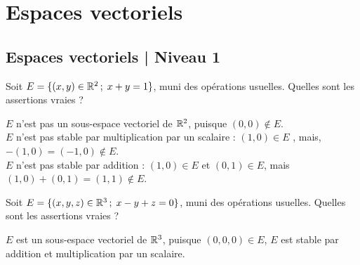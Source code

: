 

\section{Espaces vectoriels}
\subsection{Espaces vectoriels | Niveau 1}

\begin{question}
Soit $E=\{(x,y)\in \mathbb{R}^2 \, ; \;  x+y=1\}$, muni des opérations usuelles. Quelles sont les assertions vraies ?
\begin{answers}  
\end{answers}
\begin{explanations}
$E$ n'est pas un sous-espace vectoriel de $\mathbb{R}^2$, puisque $(0,0) \notin E$.\\
$E$ n'est pas stable par multiplication par un scalaire : $(1,0) \in E$ , mais,  $-(1,0)=(-1,0) \notin E$.\\
$E$ n'est pas stable par addition : $(1,0)  \in E $ et $(0,1)  \in E $, mais $(1,0)+(0,1)=(1,1) \notin E$.
\end{explanations}
\end{question}



\begin{question}
Soit $E=\{(x,y,z) \in \mathbb{R}^3 \,  ; \; x-y+z=0\}$, muni des opérations usuelles. Quelles sont les assertions vraies ?
\begin{answers}  
\end{answers}
\begin{explanations}
$E$ est un sous-espace vectoriel de $\mathbb{R}^3$, puisque $(0,0,0) \in E$, $E$ est stable par addition 
et multiplication par un scalaire.
\end{explanations}
\end{question}


